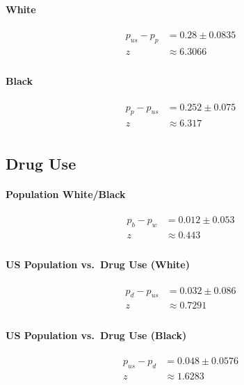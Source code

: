 \documentclass[letterpaper, landscape]{exam}
\begin{document}
  \paragraph{White} %
  \begin{align*}
    p_{us} - p_p & = 0.28 \pm 0.0835 \\
    z            & \approx 6.3066 \\
  \end{align*}
  
  \paragraph{Black} %
  \begin{align*}
    p_p - p_{us} & = 0.252 \pm 0.075 \\
    z            & \approx 6.317 \\
  \end{align*}

  \subsection{Drug Use} %

  \paragraph{Population White/Black}
  \begin{align*}
    p_b - p_w & = 0.012 \pm 0.053 \\
    z         & \approx 0.443 \\
  \end{align*}
  
  \paragraph{US Population vs.\ Drug Use (White)}
  \begin{align*}
    p_d - p_{us} & = 0.032 \pm 0.086 \\
    z            & \approx 0.7291 \\
  \end{align*}
  
  \paragraph{US Population vs.\ Drug Use (Black)}
  \begin{align*}
    p_{us} - p_{d} & = 0.048 \pm 0.0576 \\
    z              & \approx 1.6283 \\
  \end{align*}
\end{document}
